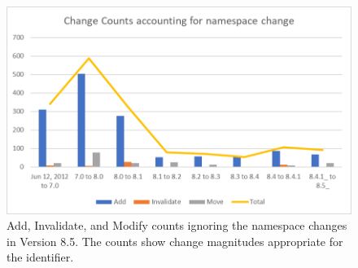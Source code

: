 \begin{figure}%
	\centering
	\includegraphics[scale=1]{figures/GCMDChart2.png}
	\caption{Add, Invalidate, and Modify counts ignoring the namespace changes in Version 8.5.  The counts show change magnitudes appropriate for the identifier.}
	\label{GCMDC2}
\end{figure}